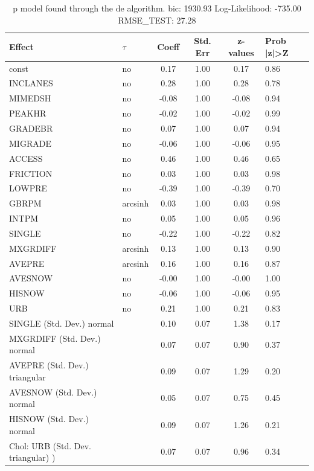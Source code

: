 \begin{table}
	\caption{p model found through the de algorithm. bic: 1930.93 Log-Likelihood: -735.00 RMSE_TEST: 27.28}
	\begin{center}
		\begin{tabular}{|l|l|c|c|c|l|}
			\hline
			Effect & $\tau$ & Coeff & Std. Err & z-values & Prob |z|>Z \\
			\hline
			const & no & 0.17 & 1.00 & 0.17 & 0.86 \\
			\hline
			INCLANES & no & 0.28 & 1.00 & 0.28 & 0.78 \\
			\hline
			MIMEDSH & no & -0.08 & 1.00 & -0.08 & 0.94 \\
			\hline
			PEAKHR & no & -0.02 & 1.00 & -0.02 & 0.99 \\
			\hline
			GRADEBR & no & 0.07 & 1.00 & 0.07 & 0.94 \\
			\hline
			MIGRADE & no & -0.06 & 1.00 & -0.06 & 0.95 \\
			\hline
			ACCESS & no & 0.46 & 1.00 & 0.46 & 0.65 \\
			\hline
			FRICTION & no & 0.03 & 1.00 & 0.03 & 0.98 \\
			\hline
			LOWPRE & no & -0.39 & 1.00 & -0.39 & 0.70 \\
			\hline
			GBRPM & arcsinh & 0.03 & 1.00 & 0.03 & 0.98 \\
			\hline
			INTPM & no & 0.05 & 1.00 & 0.05 & 0.96 \\
			\hline
			SINGLE & no & -0.22 & 1.00 & -0.22 & 0.82 \\
			\hline
			MXGRDIFF & arcsinh & 0.13 & 1.00 & 0.13 & 0.90 \\
			\hline
			AVEPRE & arcsinh & 0.16 & 1.00 & 0.16 & 0.87 \\
			\hline
			AVESNOW & no & -0.00 & 1.00 & -0.00 & 1.00 \\
			\hline
			HISNOW & no & -0.06 & 1.00 & -0.06 & 0.95 \\
			\hline
			URB & no & 0.21 & 1.00 & 0.21 & 0.83 \\
			\hline
			SINGLE (Std. Dev.) normal &  & 0.10 & 0.07 & 1.38 & 0.17 \\
			\hline
			MXGRDIFF (Std. Dev.) normal &  & 0.07 & 0.07 & 0.90 & 0.37 \\
			\hline
			AVEPRE (Std. Dev.) triangular &  & 0.09 & 0.07 & 1.29 & 0.20 \\
			\hline
			AVESNOW (Std. Dev.) normal &  & 0.05 & 0.07 & 0.75 & 0.45 \\
			\hline
			HISNOW (Std. Dev.) normal &  & 0.09 & 0.07 & 1.26 & 0.21 \\
			\hline
			 Chol: URB (Std. Dev. triangular) ) &  & 0.07 & 0.07 & 0.96 & 0.34 \\
			\hline
		\end{tabular}
	\end{center}
\end{table}